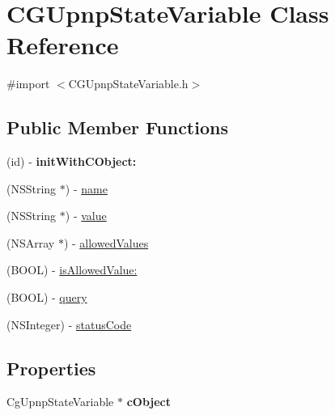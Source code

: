 \hypertarget{interface_c_g_upnp_state_variable}{\section{C\-G\-Upnp\-State\-Variable Class Reference}
\label{interface_c_g_upnp_state_variable}
}


{\ttfamily \#import $<$C\-G\-Upnp\-State\-Variable.\-h$>$}

\subsection*{Public Member Functions}
\begin{DoxyCompactItemize}
\item 
\hypertarget{interface_c_g_upnp_state_variable_a1f7c4c8a92d83d1612aeeb60f8d3f978}{(id) -\/ {\bfseries init\-With\-C\-Object\-:}}\label{interface_c_g_upnp_state_variable_a1f7c4c8a92d83d1612aeeb60f8d3f978}

\item 
(N\-S\-String $\ast$) -\/ \hyperlink{interface_c_g_upnp_state_variable_a69e4c6092d5686153daf3ca471de60ea}{name}
\item 
(N\-S\-String $\ast$) -\/ \hyperlink{interface_c_g_upnp_state_variable_a65cc40ec260a46058fc3e7a0011c4dfc}{value}
\item 
(N\-S\-Array $\ast$) -\/ \hyperlink{interface_c_g_upnp_state_variable_a647b10c9e528833b2bace189f4598be9}{allowed\-Values}
\item 
(B\-O\-O\-L) -\/ \hyperlink{interface_c_g_upnp_state_variable_ab515de3489f9f5186192eaa5e654c3ef}{is\-Allowed\-Value\-:}
\item 
(B\-O\-O\-L) -\/ \hyperlink{interface_c_g_upnp_state_variable_a5a46cedaa5838d6cc8577077dc04b079}{query}
\item 
(N\-S\-Integer) -\/ \hyperlink{interface_c_g_upnp_state_variable_abe5e011694b2cd1c01e34129873d2a5a}{status\-Code}
\end{DoxyCompactItemize}
\subsection*{Properties}
\begin{DoxyCompactItemize}
\item 
\hypertarget{interface_c_g_upnp_state_variable_a0ca3a6ac372c44f6256374dc5ef4d5fd}{Cg\-Upnp\-State\-Variable $\ast$ {\bfseries c\-Object}}\label{interface_c_g_upnp_state_variable_a0ca3a6ac372c44f6256374dc5ef4d5fd}

\end{DoxyCompactItemize}


